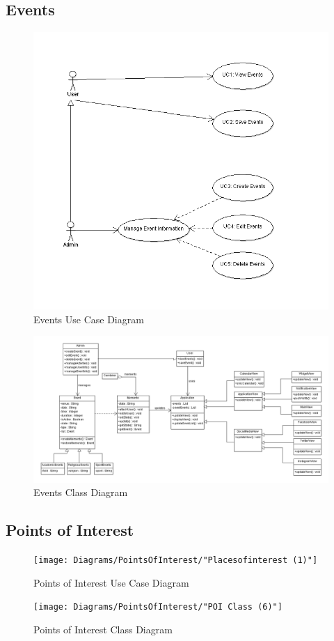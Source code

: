 \documentclass[11pt]{article}
\begin{document}
	\subsection{Events}
	\begin{figure}[!h]
        \centering
        \includegraphics[width=\textwidth]{Diagrams/Events/AzharEventsUseCaseDiagram}
        \caption{Events Use Case Diagram}
        \label{fig:events_use_case}
    \end{figure}
    \begin{figure}[!h]
        \centering
        \includegraphics[width=\textwidth]{Diagrams/Events/AzharEventsClassDiagram}
        \caption{Events Class Diagram}
        \label{fig:events_class}
    \end{figure}
	\subsection{Points of Interest}
	\begin{figure}[!h]
        \centering
        \texttt{[image: Diagrams/PointsOfInterest/"Placesofinterest (1)"]}
        \caption{Points of Interest Use Case Diagram}
        \label{fig:poi_use_case}
    \end{figure}
    \begin{figure}[!h]
        \centering
        \texttt{[image: Diagrams/PointsOfInterest/"POI Class (6)"]}
        \caption{Points of Interest Class Diagram}
        \label{fig:poi_class}
    \end{figure}
\end{document}
